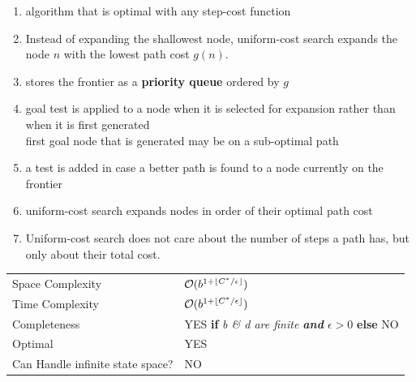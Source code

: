 \begin{enumerate}
    \item algorithm that is optimal with any step-cost function

    \item Instead of expanding the shallowest node, uniform-cost search expands the node $n$ with the lowest path cost $g(n)$.

    \item stores the frontier as a \textbf{priority queue} ordered by $g$

    \item goal test is applied to a node when it is selected for expansion rather than when it is first generated\\
    first goal node that is generated may be on a sub-optimal path

    \item a test is added in case a better path is found to a node currently on the frontier

    \item uniform-cost search expands nodes in order of their optimal path cost

    \item Uniform-cost search does not care about the number of steps a path has, but only about their total cost.
\end{enumerate}

\vspace{0.5cm}

\begin{customTableWrapper}{1.2}
\begin{longtable}{p{3cm} p{6cm}}
    Space Complexity & $\mathcal{O}(b^{1 + \left \lfloor C^\ast/ \epsilon \right \rfloor})$ \\

    Time Complexity & $\mathcal{O}(b^{1 + \left \lfloor C^\ast/ \epsilon \right \rfloor})$ \\

    \hline
    
    Completeness & YES \textbf{if} \textit{b \& d are finite \textbf{and} $\epsilon > 0$} \textbf{else} NO\\

    Optimal & YES \\

    Can Handle infinite state space? & NO \\
\end{longtable}
\end{customTableWrapper}


